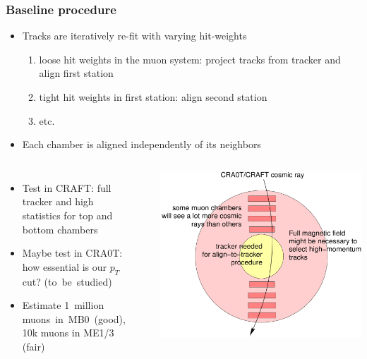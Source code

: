 \documentclass[compress]{beamer}
\begin{document}
\begin{frame}
\frametitle{Baseline procedure}

\begin{itemize}
\item Tracks are iteratively re-fit with varying hit-weights
\begin{enumerate}
\item loose hit weights in the muon system: project tracks from tracker and align first station
\item tight hit weights in first station: align second station
\item etc.
\end{enumerate}
\item Each chamber is aligned independently of its neighbors
\end{itemize}

\vfill
\begin{columns}
\begin{itemize}\setlength{\itemsep}{0.25 cm}
\item Test in CRAFT: full tracker and high statistics for top and bottom chambers

\item Maybe test in CRA0T: how essential is our $p_T$ cut? \mbox{(to be studied)\hspace{-1 cm}}

\item Estimate 1~million \mbox{muons in MB0 (good),\hspace{-2 cm}} \\ 10k muons in ME1/3 (fair)
\end{itemize}

\vspace{0.3 cm}\mbox{ }

\includegraphics[width=\linewidth]{craft.pdf}
\end{columns}
\end{frame}
\end{document}
